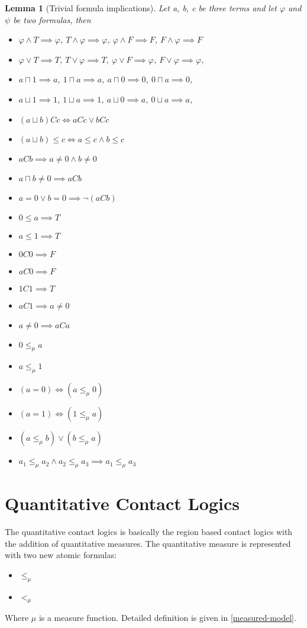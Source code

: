 \documentclass{article}
\newtheorem{lemma}[theorem]{Lemma}
\begin{document}
\begin{lemma}[Trivial formula implications]
	Let a, b, c be three terms and let $\varphi$ and $\psi$ be two formulas, then
	\begin{itemize}
		\item $\varphi \land T \implies \varphi$,\;\; $T \land \varphi \implies \varphi$,\;\;
		      $\varphi \land F \implies F$,\;\; $F \land \varphi \implies F$
		\item $\varphi \lor T \implies T$,\;\; $T \lor \varphi \implies T$,\;\;
		      $\varphi \lor F \implies \varphi$,\;\; $F \lor \varphi \implies \varphi$,
		\item $a \sqcap 1 \implies a$,\;\; $1 \sqcap a \implies a$,\;\;
		      $a \sqcap 0 \implies 0$,\;\; $0 \sqcap a \implies 0$,
		\item $a \sqcup 1 \implies 1$,\;\; $1 \sqcup a \implies 1$,\;\;
		      $a \sqcup 0 \implies a$,\;\; $0 \sqcup a \implies a$,
		\item $(a \sqcup b)Cc \iff aCc \lor bCc$
		\item $(a \sqcup b) \leq c \iff a \leq c \land b \leq c$
		\item $aCb \implies a \neq 0 \land b \neq 0$
		\item $a \sqcap b \neq 0 \implies aCb$
		\item $a = 0 \lor b = 0 \implies \neg(aCb)$
		\item $0 \leq a \implies T$
		\item $a \leq 1 \implies T$
		\item $0C0 \implies F$
		\item $aC0 \implies F$
		\item $1C1 \implies T$
		\item $aC1 \implies a \neq 0$
		\item $a \neq 0 \implies aCa$
		\item $0 \le_\mu a$
		\item $a \le_\mu 1$
		\item $(a = 0) \iff (a \le_\mu 0)$
		\item $(a = 1) \iff (1 \le_\mu a)$
		\item $(a \le_\mu b) \lor (b \le_\mu a)$
		\item $a_1 \le_\mu a_2 \land a_2 \le_\mu a_3 \implies a_1 \le_\mu a_3$

	\end{itemize}
\end{lemma}

	\newpage
	\section{Quantitative Contact Logics}
		The quantitative contact logics is basically the region based contact logics with the addition of quantitative measures. The quantitative measure is represented 
		with two new atomic formulas:
		\begin{itemize} 
			\item $\le_\mu$
			\item $<_\mu$
		\end{itemize}
		Where $\mu$ is a measure function. Detailed definition is given in \ref{measured-model}.
	
\end{document}
